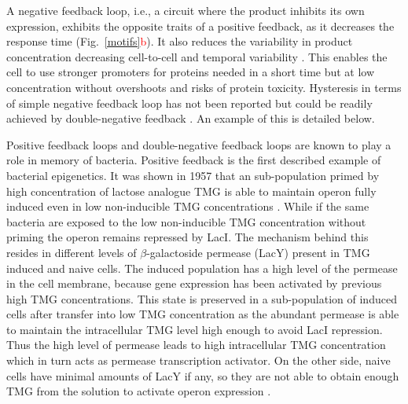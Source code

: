 A negative feedback loop, i.e., a circuit where the product inhibits its own expression, exhibits the opposite traits of a positive feedback, as it decreases the response time \cite{rosenfeld2002negative} (Fig.~\ref{motifs}\textcolor{red}{b}).
It also reduces the variability in product concentration decreasing cell-to-cell and temporal variability \cite{becskei2000engineering}.
This enables the cell to use stronger promoters for proteins needed in a short time but at low concentration without overshoots and risks of protein toxicity.
Hysteresis in terms of simple negative feedback loop has not been reported but could be readily achieved by double-negative feedback \cite{toman1985system}.
An example of this is detailed below.

Positive feedback loops and double-negative feedback loops are known to play a role in memory of bacteria.
Positive feedback is the first described example of bacterial epigenetics.
It was shown in 1957 that an  sub-population primed by high concentration of lactose analogue TMG is able to maintain  operon fully induced even in low non-inducible TMG concentrations \cite{novick1957enzyme}.
While if the same bacteria are exposed to the low non-inducible TMG concentration without priming the  operon remains repressed by LacI.
The mechanism behind this resides in different levels of $\beta$-galactoside permease (LacY) present in TMG induced and naive cells.
The induced population has a high level of the permease in the cell membrane, because  gene expression has been activated by previous high TMG concentrations.
This state is preserved in a sub-population of induced cells after transfer into low TMG concentration as the abundant permease is able to maintain the intracellular TMG level high enough to avoid LacI repression.
Thus the high level of permease leads to high intracellular TMG concentration which in turn acts as permease transcription activator.
On the other side, naive cells have minimal amounts of LacY if any, so they are not able to obtain enough TMG from the solution to activate  operon expression \cite{smits2006phenotypic, casadesus2013programmed}.

